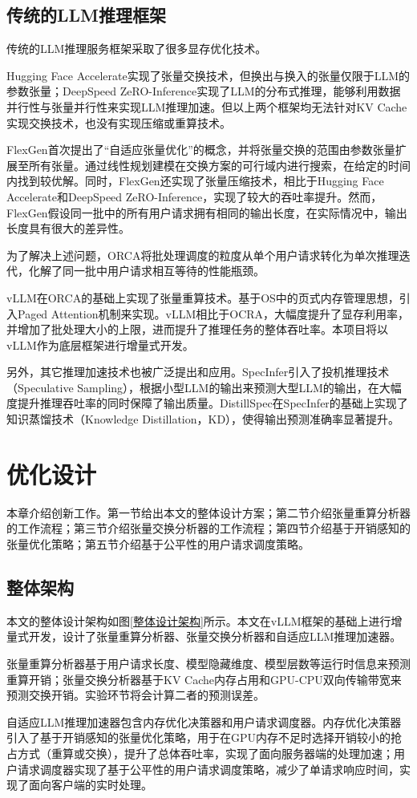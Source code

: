 \documentclass[a4paper, nosysfonts]{hpcchina}
\begin{document}
\subsection{传统的LLM推理框架}
传统的LLM推理服务框架采取了很多显存优化技术。 \par
Hugging Face Accelerate实现了张量交换技术，但换出与换入的张量仅限于LLM的参数张量；DeepSpeed ZeRO-Inference实现了LLM的分布式推理，能够利用数据并行性与张量并行性来实现LLM推理加速。但以上两个框架均无法针对KV Cache实现交换技术，也没有实现压缩或重算技术。 \par
FlexGen首次提出了“自适应张量优化”的概念，并将张量交换的范围由参数张量扩展至所有张量。通过线性规划建模在交换方案的可行域内进行搜索，在给定的时间内找到较优解。同时，FlexGen还实现了张量压缩技术，相比于Hugging Face Accelerate和DeepSpeed ZeRO-Inference，实现了较大的吞吐率提升。然而，FlexGen假设同一批中的所有用户请求拥有相同的输出长度，在实际情况中，输出长度具有很大的差异性。 \par
为了解决上述问题，ORCA将批处理调度的粒度从单个用户请求转化为单次推理迭代，化解了同一批中用户请求相互等待的性能瓶颈。 \par
vLLM在ORCA的基础上实现了张量重算技术。基于OS中的页式内存管理思想，引入Paged Attention机制来实现。vLLM相比于OCRA，大幅度提升了显存利用率，并增加了批处理大小的上限，进而提升了推理任务的整体吞吐率。本项目将以vLLM作为底层框架进行增量式开发。 \par
另外，其它推理加速技术也被广泛提出和应用。SpecInfer引入了投机推理技术（Speculative Sampling），根据小型LLM的输出来预测大型LLM的输出，在大幅度提升推理吞吐率的同时保障了输出质量。DistillSpec在SpecInfer的基础上实现了知识蒸馏技术（Knowledge Distillation，KD），使得输出预测准确率显著提升。 \par

\section{优化设计}
本章介绍创新工作。第一节给出本文的整体设计方案；第二节介绍张量重算分析器的工作流程；第三节介绍张量交换分析器的工作流程；第四节介绍基于开销感知的张量优化策略；第五节介绍基于公平性的用户请求调度策略。

\subsection{整体架构}
本文的整体设计架构如图\ref{整体设计架构}所示。本文在vLLM框架的基础上进行增量式开发，设计了张量重算分析器、张量交换分析器和自适应LLM推理加速器。 \par
张量重算分析器基于用户请求长度、模型隐藏维度、模型层数等运行时信息来预测重算开销；张量交换分析器基于KV Cache内存占用和GPU-CPU双向传输带宽来预测交换开销。实验环节将会计算二者的预测误差。 \par
自适应LLM推理加速器包含内存优化决策器和用户请求调度器。内存优化决策器引入了基于开销感知的张量优化策略，用于在GPU内存不足时选择开销较小的抢占方式（重算或交换），提升了总体吞吐率，实现了面向服务器端的处理加速；用户请求调度器实现了基于公平性的用户请求调度策略，减少了单请求响应时间，实现了面向客户端的实时处理。 \par
\end{document}
